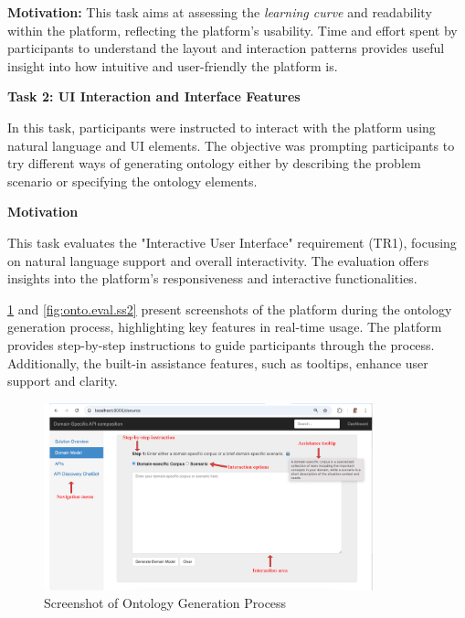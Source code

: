 \textbf{Motivation:} This task aims at assessing the \emph{learning
curve} and readability within the platform, reflecting the platform's
usability. Time and effort spent by participants to understand the
layout and interaction patterns provides useful insight into how
intuitive and user-friendly the platform is.

\textbf{Task 2: UI Interaction and Interface Features}

In this task, participants were instructed to interact with the platform
using natural language and UI elements. The objective was prompting
participants to try different ways of generating ontology either by
describing the problem scenario or specifying the ontology elements.

\textbf{Motivation}

This task evaluates the "Interactive User Interface" requirement (TR1),
focusing on natural language support and overall interactivity. The
evaluation offers insights into the platform's responsiveness and
interactive functionalities.


\cref{fig:onto.eval.ss1} and \cref{fig:onto.eval.ss2} present screenshots of the platform during the
ontology generation process, highlighting key features in real-time
usage. The platform provides step-by-step instructions to guide
participants through the process. Additionally, the built-in assistance
features, such as tooltips, enhance user support and clarity.

\begin{figure}[hbt]
\hypertarget{fig:onto.eval.ss1}{%
\centering
\includegraphics[width=0.85\textwidth]{../figures/MyFigures/ScreenshootNew.drawio.pdf}
\captionsetup{justification=centering}
\caption{Screenshot of Ontology Generation Process}\label{fig:onto.eval.ss1}
}
\end{figure}

